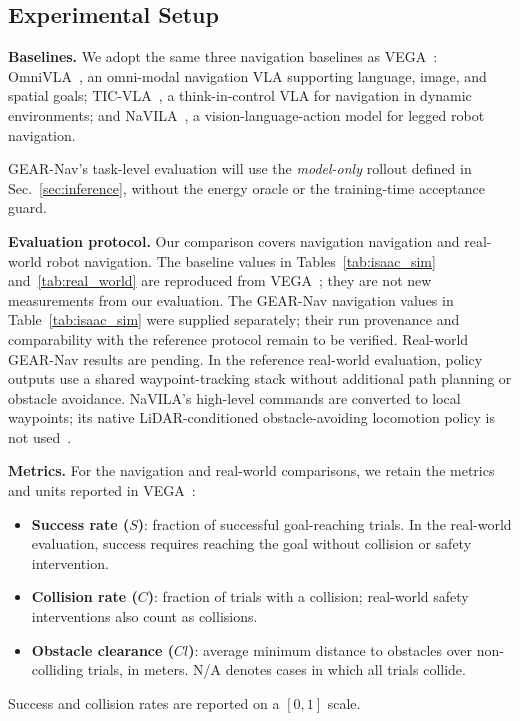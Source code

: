 \documentclass[letterpaper, 10 pt, conference]{ieeeconf}  %
\begin{document}
\subsection{Experimental Setup}
\label{sec:experimental_setup}

\textbf{Baselines.}
We adopt the same three navigation baselines as VEGA~\cite{vega}:
OmniVLA~\cite{omnivla}, an omni-modal navigation VLA supporting language,
image, and spatial goals; TIC-VLA~\cite{ticvla}, a think-in-control VLA for
navigation in dynamic environments; and NaVILA~\cite{navila}, a
vision-language-action model for legged robot navigation.

GEAR-Nav's task-level evaluation will use the \emph{model-only} rollout
defined in Sec.~\ref{sec:inference}, without the energy oracle or the
training-time acceptance guard.

\textbf{Evaluation protocol.}
Our comparison covers navigation navigation and real-world robot navigation.
The baseline values in Tables~\ref{tab:isaac_sim} and~\ref{tab:real_world}
are reproduced from VEGA~\cite{vega}; they are not new measurements from
our evaluation. The GEAR-Nav navigation values in Table~\ref{tab:isaac_sim}
were supplied separately; their run provenance and comparability with the
reference protocol remain to be verified. Real-world GEAR-Nav results are
pending. In the reference real-world evaluation,
policy outputs use a shared waypoint-tracking stack without additional path
planning or obstacle avoidance. NaVILA's high-level commands are converted
to local waypoints; its native LiDAR-conditioned obstacle-avoiding locomotion
policy is not used~\cite{vega}.

\textbf{Metrics.}
For the navigation and real-world comparisons, we retain the metrics and
units reported in VEGA~\cite{vega}:
\begin{itemize}
    \item \textbf{Success rate ($S$)}: fraction of successful goal-reaching
    trials. In the real-world evaluation, success requires reaching the goal
    without collision or safety intervention.
    \item \textbf{Collision rate ($C$)}: fraction of trials with a collision;
    real-world safety interventions also count as collisions.
    \item \textbf{Obstacle clearance ($Cl$)}: average minimum distance to
    obstacles over non-colliding trials, in meters. N/A denotes cases in
    which all trials collide.
\end{itemize}
Success and collision rates are reported on a $[0,1]$ scale.
\end{document}

